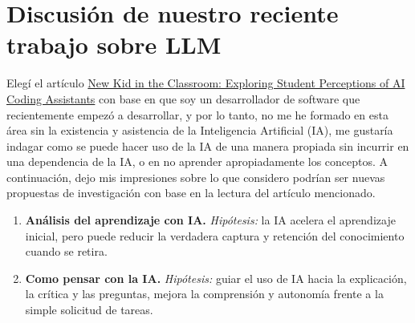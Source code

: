 \documentclass[12pt,a4paper]{article}
\begin{document}
\section{Discusión de nuestro reciente trabajo sobre LLM}
Elegí el artículo \href{https://arxiv.org/pdf/2507.22900v2}{New Kid in the Classroom: Exploring Student 
Perceptions of AI Coding Assistants} con base en que soy un desarrollador de software que recientemente 
empezó a desarrollar, y por lo tanto, no me he formado en esta área sin la existencia y asistencia de la 
Inteligencia Artificial (IA), me gustaría indagar como se puede hacer uso de la IA de una manera propiada 
sin incurrir en una dependencia de la IA, o en no aprender apropiadamente los conceptos. A continuación, 
dejo mis impresiones sobre lo que considero podrían ser nuevas propuestas de investigación con base en la 
lectura del artículo mencionado.

\begin{enumerate}
  \item \textbf{Análisis del aprendizaje con IA.} 
  \textit{Hipótesis:} la IA acelera el aprendizaje inicial, pero puede reducir la verdadera captura y 
  retención del conocimiento cuando se retira. 

  \item \textbf{Como pensar con la IA.} 
  \textit{Hipótesis:} guiar el uso de IA hacia la explicación, la crítica y las preguntas, mejora la 
  comprensión y autonomía frente a la simple solicitud de tareas. 
\end{enumerate}
\end{document}
